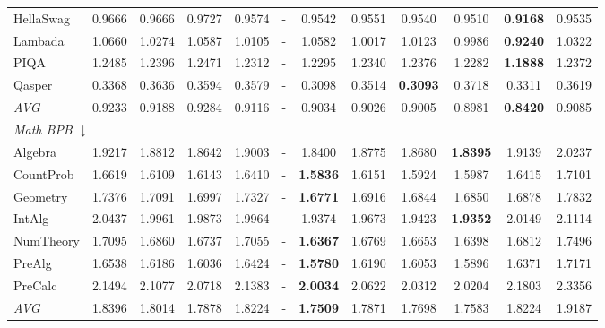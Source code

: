 \begin{table}[htbp]
\begin{tabular}{lccccccccccc}
HellaSwag & 0.9666 & 0.9666 & 0.9727 & 0.9574 & - & 0.9542 & 0.9551 & 0.9540 & 0.9510 & \textbf{0.9168} & 0.9535 \\
Lambada & 1.0660 & 1.0274 & 1.0587 & 1.0105 & - & 1.0582 & 1.0017 & 1.0123 & 0.9986 & \textbf{0.9240} & 1.0322 \\
PIQA & 1.2485 & 1.2396 & 1.2471 & 1.2312 & - & 1.2295 & 1.2340 & 1.2376 & 1.2282 & \textbf{1.1888} & 1.2372 \\
Qasper & 0.3368 & 0.3636 & 0.3594 & 0.3579 & - & 0.3098 & 0.3514 & \textbf{0.3093} & 0.3718 & 0.3311 & 0.3619 \\
\textit{AVG} & 0.9233 & 0.9188 & 0.9284 & 0.9116 & - & 0.9034 & 0.9026 & 0.9005 & 0.8981 & \textbf{0.8420} & 0.9085 \\
\midrule
\multicolumn{12}{l}{\textit{Math BPB} $\downarrow$} \\
Algebra & 1.9217 & 1.8812 & 1.8642 & 1.9003 & - & 1.8400 & 1.8775 & 1.8680 & \textbf{1.8395} & 1.9139 & 2.0237 \\
CountProb & 1.6619 & 1.6109 & 1.6143 & 1.6410 & - & \textbf{1.5836} & 1.6151 & 1.5924 & 1.5987 & 1.6415 & 1.7101 \\
Geometry & 1.7376 & 1.7091 & 1.6997 & 1.7327 & - & \textbf{1.6771} & 1.6916 & 1.6844 & 1.6850 & 1.6878 & 1.7832 \\
IntAlg & 2.0437 & 1.9961 & 1.9873 & 1.9964 & - & 1.9374 & 1.9673 & 1.9423 & \textbf{1.9352} & 2.0149 & 2.1114 \\
NumTheory & 1.7095 & 1.6860 & 1.6737 & 1.7055 & - & \textbf{1.6367} & 1.6769 & 1.6653 & 1.6398 & 1.6812 & 1.7496 \\
PreAlg & 1.6538 & 1.6186 & 1.6036 & 1.6424 & - & \textbf{1.5780} & 1.6190 & 1.6053 & 1.5896 & 1.6371 & 1.7171 \\
PreCalc & 2.1494 & 2.1077 & 2.0718 & 2.1383 & - & \textbf{2.0034} & 2.0622 & 2.0312 & 2.0204 & 2.1803 & 2.3356 \\
\textit{AVG} & 1.8396 & 1.8014 & 1.7878 & 1.8224 & - & \textbf{1.7509} & 1.7871 & 1.7698 & 1.7583 & 1.8224 & 1.9187 \\
\bottomrule
\end{tabular}
\end{table}

